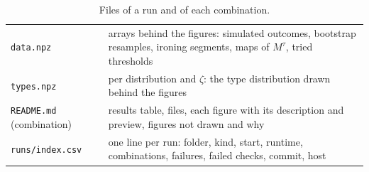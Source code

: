 \documentclass[11pt]{article}
\newcommand{\code}[1]{\texttt{#1}}
\begin{document}
\begin{table}[ht]
\begin{tabularx}{\linewidth}{@{}l L@{}}
\code{data.npz} & arrays behind the figures: simulated outcomes, bootstrap resamples, ironing segments, maps of $M^\tau$, tried thresholds \\
\code{types.npz} & per distribution and $\zeta$: the type distribution drawn behind the figures \\
\code{README.md} (combination) & results table, files, each figure with its description and preview, figures not drawn and why \\
\code{runs/index.csv} & one line per run: folder, kind, start, runtime, combinations, failures, failed checks, commit, host \\
\bottomrule
\end{tabularx}
\caption{Files of a run and of each combination.}
\label{tab:files}
\end{table}
\end{document}
